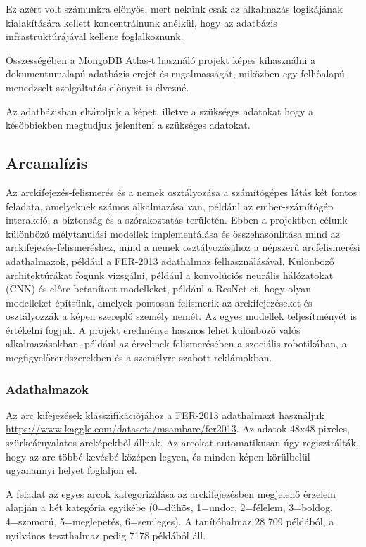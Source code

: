 \documentclass[12pt,a4]{article}
\begin{document}
            Ez azért volt számunkra előnyös, mert nekünk csak az alkalmazás logikájának kialakítására kellett koncentrálnunk anélkül, hogy az adatbázis infrastruktúrájával kellene foglalkoznunk.

            Összességében a MongoDB Atlas-t használó projekt képes kihasználni a dokumentumalapú adatbázis erejét és rugalmasságát, miközben egy felhőalapú menedzselt szolgáltatás előnyeit is élvezné.

            Az adatbázisban eltároljuk a képet, illetve a szükséges adatokat hogy a későbbiekben megtudjuk jeleníteni a szükséges adatokat.
            
        \subsection{Arcanalízis}

            Az arckifejezés-felismerés és a nemek osztályozása a számítógépes látás két fontos feladata, amelyeknek számos alkalmazása van, például az ember-számítógép interakció, a biztonság és a szórakoztatás területén. Ebben a projektben célunk különböző mélytanulási modellek implementálása és összehasonlítása mind az arckifejezés-felismeréshez, mind a nemek osztályozásához a népszerű arcfelismerési adathalmazok, például a FER-2013 adathalmaz felhasználásával. Különböző architektúrákat fogunk vizsgálni, például a konvolúciós neurális hálózatokat (CNN) és előre betanított modelleket, például a ResNet-et, hogy olyan modelleket építsünk, amelyek pontosan felismerik az arckifejezéseket és osztályozzák a képen szereplő személy nemét. Az egyes modellek teljesítményét is értékelni fogjuk. A projekt eredménye hasznos lehet különböző valós alkalmazásokban, például az érzelmek felismerésében a szociális robotikában, a megfigyelőrendszerekben és a személyre szabott reklámokban.
        
            \subsubsection{Adathalmazok}
                Az arc kifejezések klasszifikációjához a FER-2013 adathalmazt használjuk \url{https://www.kaggle.com/datasets/msambare/fer2013}. Az adatok 48x48 pixeles, szürkeárnyalatos arcképekből állnak. Az arcokat automatikusan úgy regisztrálták, hogy az arc többé-kevésbé középen legyen, és minden képen körülbelül ugyanannyi helyet foglaljon el.
                
                A feladat az egyes arcok kategorizálása az arckifejezésben megjelenő érzelem alapján a hét kategória egyikébe (0=dühös, 1=undor, 2=félelem, 3=boldog, 4=szomorú, 5=meglepetés, 6=semleges). A tanítóhalmaz 28 709 példából, a nyilvános teszthalmaz pedig 7178 példából áll.
                
\end{document}

